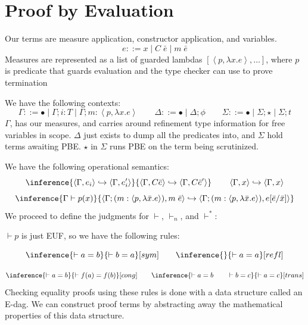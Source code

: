 
\newpage

\section{Proof by Evaluation}\label{sec:pbe}

Our terms are measure application, constructor application, and variables.
\[e ::= x \mid C\;\bar e \mid m\;\bar e\]
Measures are represented as a list of guarded lambdas $[\left<p,\lambda x.e\right>,\ldots]$,
where $p$ is predicate that guards evaluation and the type checker can use to prove termination

We have the following contexts:
\[\Gamma ::= \bullet\mid \Gamma; i :T \mid \Gamma; m : \left<p,\lambda x.e\right> \qquad
\Delta ::= \bullet\mid \Delta; \phi \qquad
\Sigma ::= \bullet\mid \Sigma; \star \mid \Sigma; t\]
$\Gamma$, has our measures, and carries around refinement
type information for free variables in scope. $\Delta$ just exists to
dump all the predicates into, and $\Sigma$ hold terms awaiting PBE. $\star$ in
$\Sigma$ runs PBE on the term being scrutinized.

We have the following operational semantics:
\[
\inference{\left<\Gamma,e_i\right> \hookrightarrow \left<\Gamma,e_i'\right>}{\left<\Gamma,C \bar e\right> \hookrightarrow\left<\Gamma,C\bar e'\right>}
\qquad
\left<\Gamma,x\right> \hookrightarrow\left<\Gamma,x\right>
\]
\[
\inference{\Gamma \vdash p(x)}
{\left<\Gamma;(m:\left<p,\lambda \bar x.e\right>),m\;\bar e\right> \hookrightarrow\left<\Gamma;(m:\left<p,\lambda \bar x . e\right>),e[\bar e/\bar x]\right>}
\]
We proceed to define the judgments for $\vdash$, $\vdash_n$, and $\vdash^*$:

$\vdash p$ is just EUF, so we have the following rules:


\[
\inference        {\vdash a=b}
               {\vdash b=a}          [sym]
\qquad
\inference        {}
               {\vdash a=a}          [refl]
\]

\[
\inference        {\vdash a=b}
            {\vdash f(a)=f(b)}       [cong]
\qquad
\inference  {\vdash a=b \qquad \vdash b = c}
                 {\vdash a=c}       [trans]
\]
Checking equality proofs using these rules is done with a data structure called
an E-dag\cite{nelson-oppen}. We can construct proof terms by abstracting away
the mathematical properties of this data structure.

